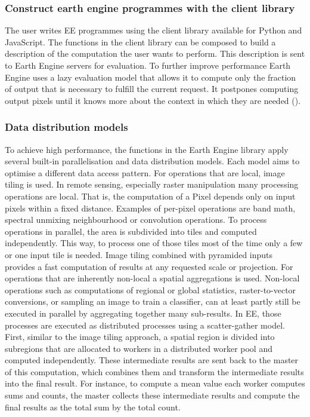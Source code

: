\subsubsection{Construct earth engine programmes with the client library}

The user writes EE programmes using the client library available for Python and JavaScript.
The functions in the client library can be composed to build a description of the computation the user wants to perform. This description is sent to Earth Engine servers for evaluation. To further improve performance Earth Engine uses a lazy evaluation model that allows it to compute only the fraction of output that is necessary to fulfill the current request. It postpones computing output pixels until it knows more about the context in which they are needed (\cite{gorelick2017google}).


\subsubsection{Data distribution models}

To achieve high performance, the functions in the Earth Engine library apply several built-in parallelisation and data distribution models. Each model aims to optimise a different data access pattern.
For operations that are local, image tiling is used.
In remote sensing, especially raster manipulation many processing operations are local. That is, the computation of a Pixel depends only on input pixels within a fixed distance. Examples of per-pixel operations are band math, spectral unmixing neighbourhood or convolution operations. To process operations in parallel, the area is subdivided into tiles and computed independently. This way, to process one of those tiles most of the time only a few or one input tile is needed. Image tiling combined with pyramided inputs provides a fast computation of results at any requested scale or projection.
For operations that are inherently non-local a spatial aggregations is used.
Non-local operations such as computations of regional or global statistics, raster-to-vector conversions, or sampling an image to train a classifier, can at least partly still be executed in parallel by aggregating together many sub-results. In EE, those processes are executed as distributed processes using a scatter-gather model. First, similar to the image tiling approach, a spatial region is divided into subregions that are allocated to workers in a distributed worker pool and computed independently. These intermediate results are sent back to the master of this computation, which combines them and transform the intermediate results into the final result. For instance, to compute a mean value each worker computes sums and counts, the master collects these intermediate results and compute the final results as the total sum by the total count.



